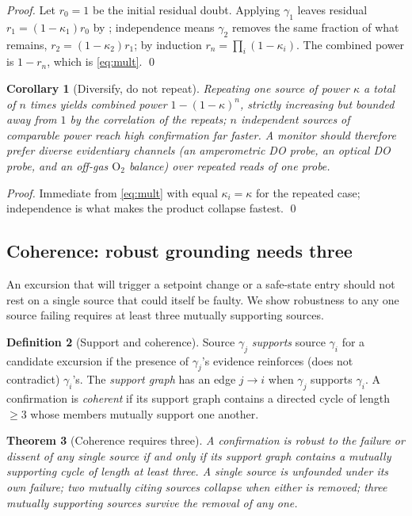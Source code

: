 \documentclass[11pt,a4paper,twocolumn]{article}
\theoremstyle{thmstyle}
\newtheorem{theorem}{Theorem}[section]
\newtheorem{corollary}[theorem]{Corollary}
\theoremstyle{definition}
\newtheorem{definition}[theorem]{Definition}
\theoremstyle{remark}
\begin{document}
\begin{proof}
Let $r_0=1$ be the initial residual doubt. Applying $\gamma_1$ leaves
residual $r_1=(1-\kappa_1)r_0$ by ; independence means
$\gamma_2$ removes the same fraction of what remains,
$r_2=(1-\kappa_2)r_1$; by induction $r_n=\prod_i(1-\kappa_i)$. The
combined power is $1-r_n$, which is \eqref{eq:mult}. \qed
\end{proof}

\begin{corollary}[Diversify, do not repeat]
\label{cor:diversify}
Repeating one source of power $\kappa$ a total of $n$ times yields
combined power $1-(1-\kappa)^n$, strictly increasing but bounded away
from $1$ by the correlation of the repeats; $n$ \emph{independent}
sources of comparable power reach high confirmation far faster. A monitor
should therefore prefer diverse evidentiary channels (an amperometric DO
probe, an optical DO probe, and an off-gas $\mathrm{O_2}$ balance) over
repeated reads of one probe.
\end{corollary}

\begin{proof}
Immediate from \eqref{eq:mult} with equal $\kappa_i=\kappa$ for the
repeated case; independence is what makes the product collapse fastest.
\qed
\end{proof}

\subsection{Coherence: robust grounding needs three}

An excursion that will trigger a setpoint change or a safe-state entry
should not rest on a single source that could itself be faulty. We show
robustness to any one source failing requires at least three mutually
supporting sources.

\begin{definition}[Support and coherence]
\label{def:support}
Source $\gamma_j$ \emph{supports} source $\gamma_i$ for a candidate
excursion if the presence of $\gamma_j$'s evidence reinforces (does not
contradict) $\gamma_i$'s. The \emph{support graph} has an edge
$j\to i$ when $\gamma_j$ supports $\gamma_i$. A confirmation is
\emph{coherent} if its support graph contains a directed cycle of length
$\ge3$ whose members mutually support one another.
\end{definition}

\begin{theorem}[Coherence requires three]
\label{thm:triangle}
A confirmation is robust to the failure or dissent of any single source
if and only if its support graph contains a mutually supporting cycle of
length at least three. A single source is unfounded under its own
failure; two mutually citing sources collapse when either is removed;
three mutually supporting sources survive the removal of any one.
\end{theorem}
\end{document}
